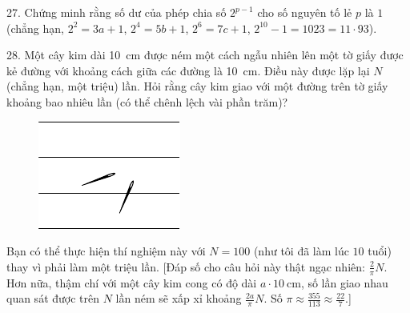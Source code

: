 \begin{problem}{27.}
	Chứng minh rằng số dư của phép chia số $2^{p-1}$ cho số nguyên tố lẻ $p$ là $1$ (chẳng hạn, $2^2 = 3a + 1$, $2^4 = 5b+1$, $2^6 = 7c+1$, $2^{10} - 1 = 1023 = 11\cdot 93$).
\end{problem}

\begin{problem}{28.}
	Một cây kim dài \SI{10}{\cm} được ném một cách ngẫu nhiên lên một tờ giấy được kẻ đường với khoảng cách giữa các đường là \SI{10}{\cm}. Điều này được lặp lại $N$ (chẳng hạn, một triệu) lần. Hỏi rằng cây kim giao với một đường trên tờ giấy khoảng bao nhiêu lần (có thể chênh lệch vài phần trăm)?
	\begin{figure}
		\includegraphics[scale=1]{taskbook-12}
	\end{figure}
	Bạn có thể thực hiện thí nghiệm này với $N=100$ (như tôi đã làm lúc $10$ tuổi) thay vì phải làm một triệu lần. [Đáp số cho câu hỏi này thật ngạc nhiên: $\frac2{\pi}N$. Hơn nữa, thậm chí với một cây kim cong có độ dài $a\cdot \SI{10}{\cm}$, số lần giao nhau quan sát được trên $N$ lần ném sẽ xấp xỉ khoảng $\frac{2a}{\pi}N$. Số $\pi\approx \frac{355}{113}\approx \frac{22}7$.]
\end{problem}


